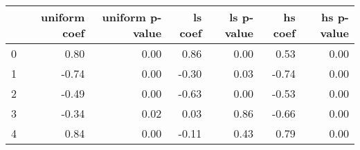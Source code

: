 \begin{tabular}{lrrrrrr}
\toprule
 & uniform coef & uniform p-value & ls coef & ls p-value & hs coef & hs p-value \\
\midrule
0 & 0.80 & 0.00 & 0.86 & 0.00 & 0.53 & 0.00 \\
1 & -0.74 & 0.00 & -0.30 & 0.03 & -0.74 & 0.00 \\
2 & -0.49 & 0.00 & -0.63 & 0.00 & -0.53 & 0.00 \\
3 & -0.34 & 0.02 & 0.03 & 0.86 & -0.66 & 0.00 \\
4 & 0.84 & 0.00 & -0.11 & 0.43 & 0.79 & 0.00 \\
\bottomrule
\end{tabular}
